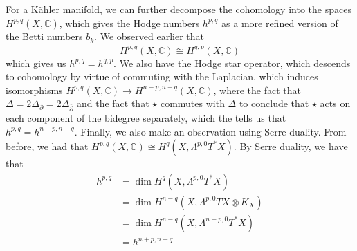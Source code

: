 \documentclass[psamsfonts, 12pt]{amsart}
\theoremstyle{definition}
\theoremstyle{remark}
\newcommand{\C}{\mathbb{C}}
\newcommand{\dbar}{\overline{\partial}}
\begin{document}
For a K\"ahler manifold, we can further decompose the cohomology into the spaces
$H^{p,q}(X,\C)$, which gives the Hodge numbers $h^{p,q}$ as a more refined version
of the Betti numbers $b_k$. We observed earlier that
\[
\overline{H^{p,q}(X,\C)} \cong H^{q,p}(X,\C)
\]
which gives us $h^{p,q} = h^{q,p}$. We also have the Hodge star operator, which
descends to cohomology by virtue of commuting with the Laplacian, which induces
isomorphisms $H^{p,q}(X,\C) \to H^{n-p,n-q}(X,\C)$, where the fact that
$\Delta = 2\Delta_\partial = 2\Delta_{\dbar}$ and the fact that $\star$ commutes with
$\Delta$ to conclude that $\star$ acts on each component of the bidegree separately,
which the tells us that $h^{p,q} = h^{n-p,n-q}$. Finally, we also make an observation
using Serre duality. From before, we had that
$H^{p,q}(X,\C) \cong H^q(X, \Lambda^{p,0}T^*X)$. By Serre duality, we have that
\begin{align*}
h^{p,q} &= \dim H^q(X,\Lambda^{p,0}T^*X) \\
&= \dim H^{n-q}(X, \Lambda^{p,0}TX \otimes K_X) \\
&= \dim H^{n-q}(X, \Lambda^{n+p,0}T^*X) \\
&= h^{n+p,n-q}
\end{align*}
\end{document}
